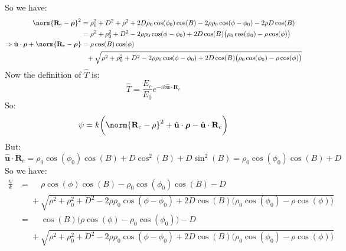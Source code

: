 \documentclass[crop=false,class=article,oneside]{standalone}
\begin{document}
            So we have:
            \begin{align*}
                \norm{\mathbf{R}_{c}-\boldsymbol{\rho}}^{2}
                &=
                \rho_{0}^{2}+D^{2}+
                \rho^{2}+2D\rho_{0}\cos(\phi_{0})\cos(B)-
                2\rho\rho_{0}\cos(\phi-\phi_{0})-2\rho D\cos(B)\\
                &=
                \rho^2+\rho_{0}^2+D^2-
                2\rho\rho_{0}\cos(\phi-\phi_{0})
                + 2D\cos(B)\big(\rho_{0}\cos(\phi_0)-
                \rho\cos(\phi)\big)\\
                \Rightarrow
                \hat{\mathbf{u}}\cdot\boldsymbol{\rho}+
                \norm{\mathbf{R}_{c}-\boldsymbol{\rho}}
                &=\rho\cos(B)\cos(\phi)\\
                &\phantom{=}+
                \sqrt{\rho^2+\rho_{0}^2+D^2-
                      2\rho\rho_{0}\cos(\phi - \phi_{0})+
                      2D\cos(B)\big(\rho_{0}\cos(\phi_0)-
                      \rho\cos(\phi)\big)}
            \end{align*}
            Now the definition of $\hat{T}$ is:
            \begin{equation*}
                \hat{T}=\frac{E_{c}}
                             {E_{0}}
                e^{-ik\hat{\mathbf{u}}\cdot\mathbf{R}_{c}}
            \end{equation*}
            So:
            \begin{equation*}
                \psi=
                k\bigg(
                    \norm{\mathbf{R}_{c}-\rho}^2+
                    \hat{\mathbf{u}}\cdot\boldsymbol{\rho}-
                    \hat{\mathbf{u}}\cdot \mathbf{R}_{c}
                \bigg)
            \end{equation*}
            But:
            \begin{equation*}
                \hat{\mathbf{u}}\cdot \mathbf{R}_{c}
                =\rho_{0}\cos(\phi_0)\cos(B) + D\cos^2(B)+
                D\sin^2(B)=\rho_{0}\cos(\phi_0)\cos(B)+D    
            \end{equation*}
            So we have:
            \begin{align*}
                \frac{\psi}{k}
                &=\phantom{+}\rho\cos(\phi)\cos(B)-
                \rho_0\cos(\phi_0)\cos(B)-D\\
                &\phantom{=}+\sqrt{\rho^2+\rho_{0}^2+D^2-
                2\rho\rho_{0}\cos(\phi-\phi_{0})+
                2D\cos(B)\big(\rho_{0}\cos(\phi_0)-
                \rho\cos(\phi)\big)}\\
                &=\phantom{+}\cos(B)\big(\rho\cos(\phi)-
                \rho_{0}\cos(\phi_{0})\big)-D\\
                &\phantom{=}+\sqrt{\rho^2+\rho_{0}^2+D^2-
                2\rho\rho_{0}\cos(\phi-\phi_{0})+
                2D\cos(B)\big(\rho_{0}\cos(\phi_0)-
                \rho\cos(\phi)\big)}
            \end{align*}
\end{document}
